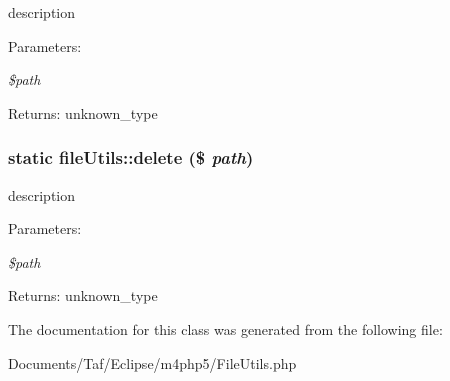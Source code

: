 description

\begin{Desc}
\item[Parameters:]
\begin{description}
\item[{\em \$path}]\end{description}
\end{Desc}
\begin{Desc}
\item[Returns:]unknown\_\-type \end{Desc}
\hypertarget{classfileUtils_dabc7aa5506dd8bcad28d9971f03256b}{
\subsubsection[delete]{\setlength{\rightskip}{0pt plus 5cm}static fileUtils::delete (\$ {\em path})}}
\label{classfileUtils_dabc7aa5506dd8bcad28d9971f03256b}


description

\begin{Desc}
\item[Parameters:]
\begin{description}
\item[{\em \$path}]\end{description}
\end{Desc}
\begin{Desc}
\item[Returns:]unknown\_\-type \end{Desc}


The documentation for this class was generated from the following file:\begin{CompactItemize}
\item 
Documents/Taf/Eclipse/m4php5/FileUtils.php\end{CompactItemize}
